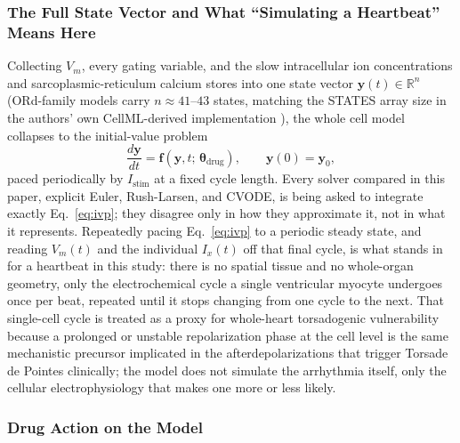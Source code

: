 \documentclass[journal]{IEEEtran}
\begin{document}
\subsubsection{The Full State Vector and What ``Simulating a Heartbeat'' Means Here}

Collecting $V_m$, every gating variable, and the slow intracellular ion concentrations and sarcoplasmic-reticulum calcium stores into one state vector $\mathbf{y}(t)\in\mathbb{R}^n$ (ORd-family models carry $n\approx41$--$43$ states, matching the STATES array size in the authors' own CellML-derived implementation \cite{pramawijaya2024thesis}), the whole cell model collapses to the initial-value problem
\begin{equation}
\frac{d\mathbf{y}}{dt} = \mathbf{f}(\mathbf{y}, t;\, \boldsymbol{\theta}_{\text{drug}}), \qquad \mathbf{y}(0) = \mathbf{y}_0,
\label{eq:ivp}
\end{equation}
paced periodically by $I_{\text{stim}}$ at a fixed cycle length. Every solver compared in this paper, explicit Euler, Rush-Larsen, and CVODE, is being asked to integrate exactly Eq.~\eqref{eq:ivp}; they disagree only in how they approximate it, not in what it represents. Repeatedly pacing Eq.~\eqref{eq:ivp} to a periodic steady state, and reading $V_m(t)$ and the individual $I_x(t)$ off that final cycle, is what stands in for a heartbeat in this study: there is no spatial tissue and no whole-organ geometry, only the electrochemical cycle a single ventricular myocyte undergoes once per beat, repeated until it stops changing from one cycle to the next. That single-cell cycle is treated as a proxy for whole-heart torsadogenic vulnerability because a prolonged or unstable repolarization phase at the cell level is the same mechanistic precursor implicated in the afterdepolarizations that trigger Torsade de Pointes clinically; the model does not simulate the arrhythmia itself, only the cellular electrophysiology that makes one more or less likely.

\subsubsection{Drug Action on the Model}
\end{document}

